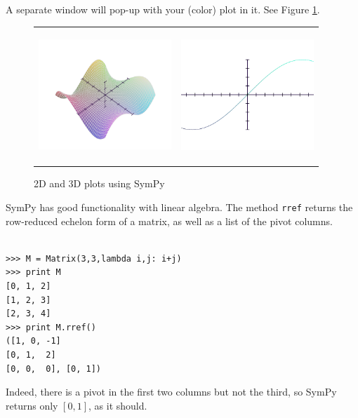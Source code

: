 \documentclass[12pt]{article}
\begin{document}
\noindent
A separate window will pop-up with your (color) plot in it.
See Figure \ref{fig:sympy-plots}.


\begin{figure}[h!]
\begin{minipage}{\textwidth}
\begin{center}
\begin{tabular}{cc}
\includegraphics[height=5cm,width=5cm]{oscas-sympy-plot1b}
 &\includegraphics[height=5cm,width=5cm]{oscas-sympy-plot2b} \\
\end{tabular}
\end{center}
\end{minipage}
\caption{2D and 3D plots using SymPy}
\label{fig:sympy-plots}
\end{figure}

SymPy has good functionality with linear algebra.
The method {\tt rref} returns the row-reduced echelon form of a matrix,
as well as a list of the pivot columns.

\begin{Verbatim}[fontsize=\scriptsize,fontfamily=courier,fontshape=tt,frame=single,label=SymPy]

>>> M = Matrix(3,3,lambda i,j: i+j)
>>> print M
[0, 1, 2]
[1, 2, 3]
[2, 3, 4]
>>> print M.rref()
([1, 0, -1]
[0, 1,  2]
[0, 0,  0], [0, 1])

\end{Verbatim}

\noindent
Indeed, there is a pivot in the first two columns but not the
third, so SymPy returns only $[0,1]$, as it should.
\end{document}
